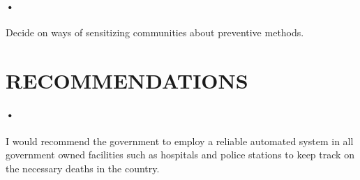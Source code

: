 \documentclass[12pt]{article}
\begin{document}
\paragraph{•}Decide on ways of sensitizing communities about preventive methods.

\section{RECOMMENDATIONS}
\paragraph{•}I would recommend the government to employ a reliable automated system in all government owned facilities such as hospitals and police stations to keep track on the necessary deaths in the country.
\end{document}
